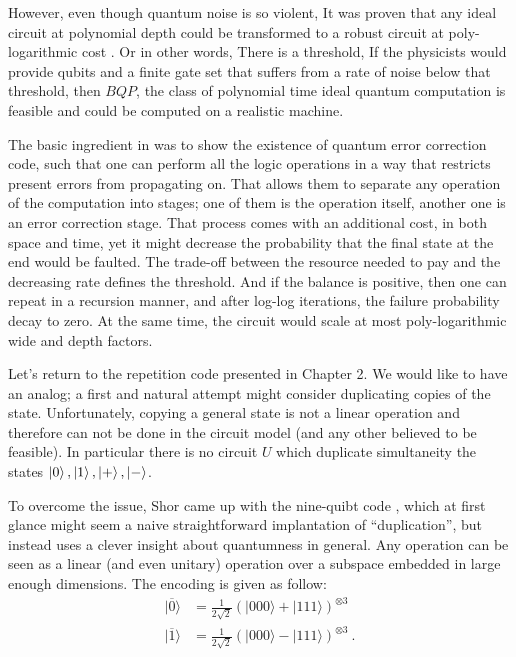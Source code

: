 
However, even though quantum noise is so violent, It was proven that any ideal circuit at polynomial depth could be transformed to a robust circuit at poly-logarithmic cost \cite{aharonov1999faulttolerant}. Or in other words, There is a threshold, If the physicists would provide qubits and a finite gate set that suffers from a rate of noise below that threshold, then $BQP$, the class of polynomial time ideal quantum computation is feasible and could be computed on a realistic machine.                

The basic ingredient in \cite{aharonov1999faulttolerant} was to show the existence of quantum error correction code, such that one can perform all the logic operations in a way that restricts present errors from propagating on. That allows them to separate any operation of the computation into stages; one of them is the operation itself, another one is an error correction stage. That process comes with an additional cost, in both space and time, yet it might decrease the probability that the final state at the end would be faulted. The trade-off between the resource needed to pay and the decreasing rate defines the threshold. And if the balance is positive, then one can repeat in a recursion manner, and after log-log iterations, the failure probability decay to zero. At the same time, the circuit would scale at most poly-logarithmic wide and depth factors.      

Let's return to the repetition code presented in Chapter 2. We would like to have an analog; a first and natural attempt might consider duplicating copies of the state. Unfortunately, copying a general state is not a linear operation and therefore can not be done in the circuit model (and any other believed to be feasible). In particular there is no circuit $U$ which duplicate simultaneity the states $\ket{0}, \ket{1}, \ket{+}, \ket{-}$.

To overcome the issue, Shor came up with the nine-quibt code \cite{Ninequ}, which at first glance might seem a naive straightforward implantation of ``duplication'', but instead uses a clever insight about quantumness in general. Any operation can be seen as a linear (and even unitary) operation over a subspace embedded in large enough dimensions. The encoding is given as follow: 
\begin{equation*}
  \begin{split}
    |\overline{0}\rangle&=\frac{1}{2\sqrt{2}}\left(|000\rangle+|111\rangle\right)^{\otimes3}\\
    |\overline{1}\rangle&=\frac{1}{2\sqrt{2}}\left(|000\rangle-|111\rangle\right)^{\otimes3}~.
  \end{split}
\end{equation*}


